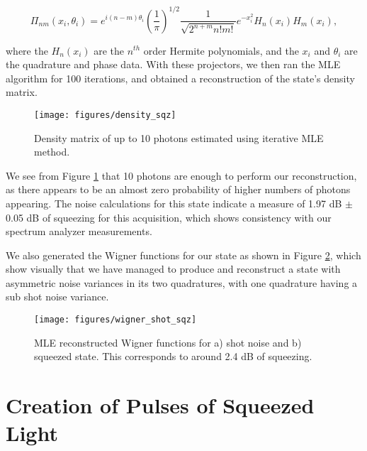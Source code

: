 \begin{equation}
  \label{eq:fock_projectors}
  \Pi_{nm}(x_i, \theta_i ) = e ^{i(n-m)\theta_i}\left(\frac{1}{\pi}\right)^{1/2} \frac{1}{\sqrt{2^{n+m}n!m!}}e^{-x^2_{i}} H_n(x_{i})H_m(x_{i}),
\end{equation}

\noindent
where the $H_n(x_i)$ are the $n^{th}$ order Hermite polynomials, and the $x_i$ and $\theta_i$ are the quadrature and phase data.  With these projectors, we then ran the MLE algorithm for 100 iterations, and obtained a reconstruction of the state's density matrix.
 
\begin{figure}[!ht] 
 \centering 
 \texttt{[image: figures/density\_sqz]} 
 \caption[Density matrix estimated using iterative MLE] {Density matrix of up to 10 photons estimated using iterative MLE method.} 
 \label{fig:density_sqz} 
\end{figure}
 
We see from Figure \ref{fig:density_sqz} that 10 photons are enough to perform our reconstruction, as there appears to be an almost zero probability of higher numbers of photons appearing.  The noise calculations for this state indicate a measure of 1.97 dB $\pm$ 0.05 dB of squeezing for this acquisition, which shows consistency with our spectrum analyzer measurements.

We also generated the Wigner functions for our state as shown in Figure \ref{fig:wigner_shot_sqz}, which show visually that we have managed to produce and reconstruct a state with asymmetric noise variances in its two quadratures, with one quadrature having a sub shot noise variance.

\begin{figure}[!ht] 
 \centering 
 \texttt{[image: figures/wigner\_shot\_sqz]} 
 \caption[Wigner functions for shot noise and squeezed state]{MLE reconstructed Wigner functions for a) shot noise and b) squeezed state.  This corresponds to around 2.4 dB of squeezing.} 
 \label{fig:wigner_shot_sqz} 
\end{figure}



\section{Creation of Pulses of Squeezed Light}
\label{creation_of_pulses_of_squeezed_light} 

